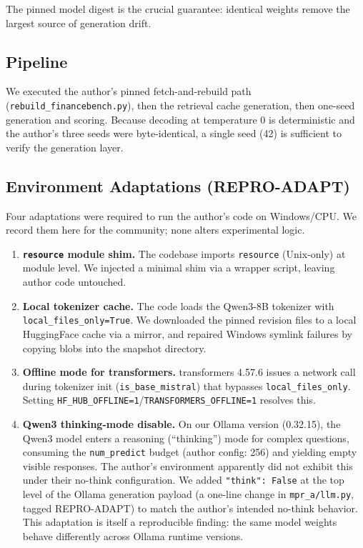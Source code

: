\documentclass[11pt]{article}
\begin{document}
The pinned model digest is the crucial guarantee: identical weights remove the largest source of generation drift.

\subsection{Pipeline}

We executed the author's pinned fetch-and-rebuild path (\texttt{rebuild\_financebench.py}), then the retrieval cache generation, then one-seed generation and scoring. Because decoding at temperature 0 is deterministic and the author's three seeds were byte-identical, a single seed (42) is sufficient to verify the generation layer.

\subsection{Environment Adaptations (REPRO-ADAPT)}\label{sec:adapt}

Four adaptations were required to run the author's code on Windows/CPU. We record them here for the community; none alters experimental logic.

\begin{enumerate}
\item \textbf{\texttt{resource} module shim.} The codebase imports \texttt{resource} (Unix-only) at module level. We injected a minimal shim via a wrapper script, leaving author code untouched.
\item \textbf{Local tokenizer cache.} The code loads the Qwen3-8B tokenizer with \texttt{local\_files\_only=True}. We downloaded the pinned revision files to a local HuggingFace cache via a mirror, and repaired Windows symlink failures by copying blobs into the snapshot directory.
\item \textbf{Offline mode for transformers.} transformers 4.57.6 issues a network call during tokenizer init (\texttt{is\_base\_mistral}) that bypasses \texttt{local\_files\_only}. Setting \texttt{HF\_HUB\_OFFLINE=1}/\texttt{TRANSFORMERS\_OFFLINE=1} resolves this.
\item \textbf{Qwen3 thinking-mode disable.} On our Ollama version (0.32.15), the Qwen3 model enters a reasoning (``thinking'') mode for complex questions, consuming the \texttt{num\_predict} budget (author config: 256) and yielding empty visible responses. The author's environment apparently did not exhibit this under their no-think configuration. We added \texttt{"think": False} at the top level of the Ollama generation payload (a one-line change in \texttt{mpr\_a/llm.py}, tagged REPRO-ADAPT) to match the author's intended no-think behavior. This adaptation is itself a reproducible finding: the same model weights behave differently across Ollama runtime versions.
\end{enumerate}
\end{document}
